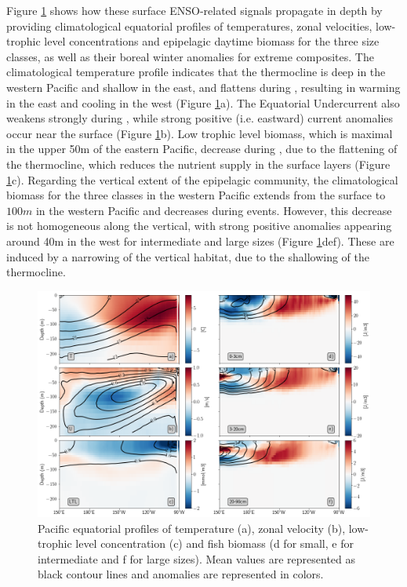 Figure \ref{fig:profiles} shows how these surface ENSO-related signals propagate in depth by providing climatological equatorial profiles of temperatures, zonal velocities, low-trophic level concentrations and epipelagic daytime biomass for the three size classes, as well as their boreal winter anomalies for extreme \nino{} composites. The climatological temperature profile indicates that the thermocline is deep in the western Pacific and shallow in the east, and flattens during \nino{}, resulting in warming in the east and cooling in the west (Figure  \ref{fig:profiles}a). The Equatorial Undercurrent also weakens strongly during \nino{}, while strong positive (i.e. eastward) current anomalies occur near the surface (Figure  \ref{fig:profiles}b). Low trophic level biomass, which is maximal in the upper 50m of the eastern Pacific, decrease during \nino{}, due to the flattening of the thermocline, which reduces the nutrient supply in the surface layers (Figure \ref{fig:profiles}c). Regarding the vertical extent of the epipelagic community, the climatological biomass for the three classes in the western Pacific extends from the surface to $100m$ in the western Pacific and decreases during \nino{} events. However, this decrease is not homogeneous along the vertical, with strong positive anomalies appearing around 40m in the west for intermediate and large sizes (Figure \ref{fig:profiles}def). These are induced by a narrowing of the vertical habitat, due to the shallowing of the thermocline. 

\begin{figure}[h!tp]
	\centering
	\includegraphics[scale=0.4]{figs/forage_mean_ond97.png}	
	\caption{Pacific equatorial profiles of temperature (a), zonal velocity (b), low-trophic level concentration (c) and fish biomass (d for small, e for intermediate and f for large sizes). Mean values are represented as black contour lines and \nino{} anomalies are represented in colors.}	
	\label{fig:profiles}
\end{figure}


